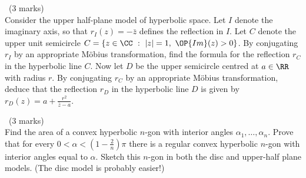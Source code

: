 \documentclass[12pt]{article}
\begin{document}
\vspace{1cm}

\begin{question}\ (3 marks)\\
  Consider the upper half-plane model of hyperbolic space. Let $I$ denote the imaginary axis, so that $r_I(z)=-\bar{z}$ defines the reflection in $I$. Let $C$ denote the upper unit semicircle $C=\{z\in\CC\ :\ |z|=1,\ \OP{Im}(z)>0\}$. By conjugating $r_I$ by an appropriate M\"obius transformation, find the formula for the reflection $r_C$ in the hyperbolic line $C$. Now let $D$ be the upper semicircle centred at $a\in\RR$ with radius $r$. By conjugating $r_C$ by an appropriate M\"obius transformation, deduce that the reflection $r_D$ in the hyperbolic line $D$ is given by $r_D(z)=a+\frac{r^2}{\bar{z}-a}$.
\end{question}

\iffalse
\begin{answer}
  The M\"obius transformation $g(z)=(z-1)/(z+1)$ sends $0$ to $-1$, $\infty$ to $1$ and $i$ to $i$, so it sends $I$ to $C$. Therefore $r_C=g\circ r_I\circ g^{-1}$ (because this is the unique M\"obius transformation other than the identity which fixes $C$ pointwise, i.e. the unique nontrivial element in the stabiliser of $C$ under the action of isometries on hyperbolic lines). We have $g^{-1}(z)=(z+1)(1-z)$, so computing, we get
  \[r_C(z)=g(r_I(g^{-1}(z)))=\frac{-\frac{\bar{z}-1}{\bar{z}+1}+1}{\frac{\bar{z}-1}{\bar{z}+1}+1}=\frac{1}{\bar{z}}.\]
  Now the M\"obius transformation $h(z)=\frac{z-a}{r}$ sends $a$ to $0$ and $D$ to $C$, so $r_D=h^{-1}\circ r_C\circ h$. We have $h^{-1}(z)=rz+a$, so
  \[r_D(z)=h^{-1}(r_C(h(z)))=a+r^2/(\bar{z}-a)\]
  as required.
\end{answer}
\newpage
\fi

\vspace{1cm}

\begin{question}\ (3 marks)\\
  Find the area of a convex hyperbolic $n$-gon with interior angles $\alpha_1,\ldots,\alpha_n$. Prove that for every $0<\alpha<\left(1-\frac{2}{n}\right)\pi$ there is a regular convex hyperbolic $n$-gon with interior angles equal to $\alpha$. Sketch this $n$-gon in both the disc and upper-half plane models. (The disc model is probably easier!)
\end{question}

\iffalse
\begin{answer}
  By subdividing the polygon into $n-2$ triangles, we apply the Gauss-Bonnet theorem to each triangle and deduce that
  \[\OP{area}(P)=(n-2)\pi-\sum\alpha_i.\]
  Let $\mu$ be an $n$th root of unity and consider the points $r\mu^k$, $k=0,1,\ldots,n-1$. When $r<1$, these form the vertices of a regular convex hyperbolic $n$-gon $P(r)$ in the disc model. As $r\to 1$, the interior angles go to zero and the area goes to $(n-2)\pi$. As $r\to 0$ the area goes to zero, so $\alpha=(\OP{area}(P(r))-(n-2)\pi)/n\to \left(1-\frac{2}{n}\right)\pi$. As the area and the angles change continuously in $r$, $\alpha$ takes every possible value in between $0$ and $\left(1-\frac{2}{n}\right)\pi$ (by the intermediate value theorem).
\end{answer}
\newpage
\fi
\end{document}
